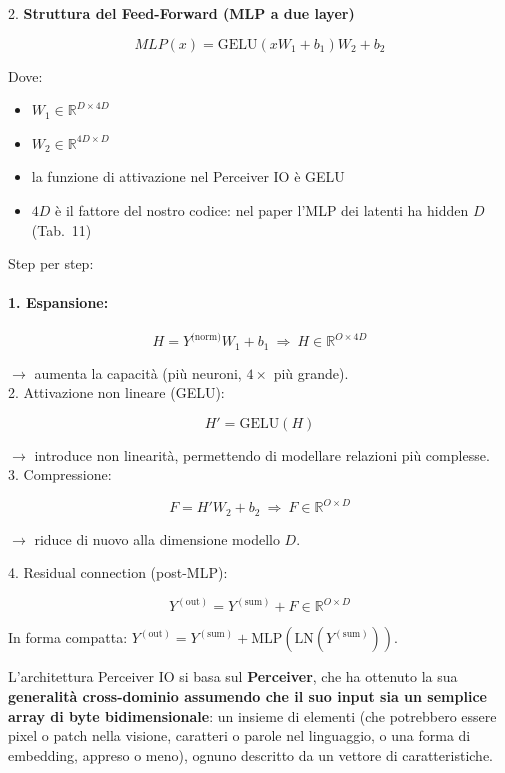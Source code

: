 \documentclass[
  11pt,
]{article}
\begin{document}
2. \textbf{Struttura del Feed-Forward (MLP a due layer)}

\[MLP(x) = \mathrm{GELU}\left( xW_{1} + b_{1} \right)W_{2} + b_{2}\]

Dove:

\begin{itemize}
\item
  \(W_{1} \in \mathbb{R}^{D \times 4D}\)
\item
  \(W_{2} \in \mathbb{R}^{4D \times D}\)
\item
  la funzione di attivazione nel Perceiver IO è GELU
\item
  $4D$ è il fattore del nostro codice: nel paper l'MLP dei latenti ha hidden $D$ (Tab.~11)
\end{itemize}

Step per step:

\paragraph{1. Espansione:}

\[H = Y^{\text{(norm)}}W_{1} + b_{1}\  \Rightarrow \ H \in \mathbb{R}^{O \times 4D}\]

\(\rightarrow\) aumenta la capacità (più neuroni, \(4 \times\) più
grande).\\
2. Attivazione non lineare (GELU):

\[H' = \mathrm{GELU}(H)\]

\(\rightarrow\) introduce non linearità, permettendo di modellare
relazioni più complesse.\\
3. Compressione:

\[F = H'W_{2} + b_{2}\  \Rightarrow \ F \in \mathbb{R}^{O \times D}\]

\(\rightarrow\) riduce di nuovo alla dimensione modello \(D\).

4. Residual connection (post-MLP):

\[Y^{(\text{out})} = Y^{(\text{sum})} + F \in \mathbb{R}^{O \times D}\]

In forma compatta: $Y^{(\text{out})} = Y^{(\text{sum})} + \mathrm{MLP}(\mathrm{LN}(Y^{(\text{sum})}))$.

L'architettura Perceiver IO si basa sul
\textbf{Perceiver}, che ha ottenuto la sua \textbf{generalità cross-dominio
assumendo che il suo input sia un semplice array di byte
bidimensionale}: un insieme di elementi (che potrebbero essere pixel o
patch nella visione, caratteri o parole nel linguaggio, o una forma di
embedding, appreso o meno), ognuno descritto da un vettore di
caratteristiche.
\end{document}
